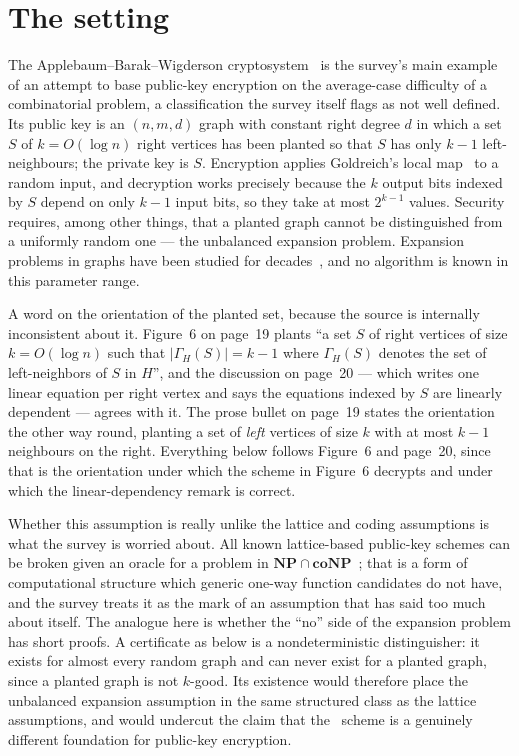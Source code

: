 \documentclass{aicr-conjecture}
\newcommand{\NP}{\mathbf{NP}}
\newcommand{\coNP}{\mathbf{coNP}}
\begin{document}
\section{The setting}\label{sec:setting}

The Applebaum--Barak--Wigderson cryptosystem~\cite{ABW10} is the
survey's main example of an attempt to base public-key encryption on
the average-case difficulty of a combinatorial problem, a
classification the survey itself flags as not well defined. Its public
key is an $(n,m,d)$ graph with constant right degree $d$ in which a set
$S$ of $k = O(\log n)$ right vertices has been planted so that $S$ has
only $k-1$ left-neighbours; the private key is $S$. Encryption applies
Goldreich's local map~\cite{Gol11,App15} to a random input, and
decryption works precisely because the $k$ output bits indexed by $S$
depend on only $k-1$ input bits, so they take at most $2^{k-1}$ values.
Security requires, among other things, that a planted graph cannot be
distinguished from a uniformly random one --- the unbalanced expansion
problem. Expansion problems in graphs have been studied for
decades~\cite{HLW06}, and no algorithm is known in this parameter
range.

A word on the orientation of the planted set, because the source is
internally inconsistent about it. Figure~6 on page~19 plants ``a set
$S$ of right vertices of size $k = O(\log n)$ such that
$|\Gamma_H(S)| = k-1$ where $\Gamma_H(S)$ denotes the set of
left-neighbors of $S$ in $H$'', and the discussion on page~20 --- which
writes one linear equation per right vertex and says the equations
indexed by $S$ are linearly dependent --- agrees with it. The prose
bullet on page~19 states the orientation the other way round, planting
a set of \emph{left} vertices of size $k$ with at most $k-1$ neighbours
on the right. Everything below follows Figure~6 and page~20, since that
is the orientation under which the scheme in Figure~6 decrypts and
under which the linear-dependency remark is correct.

Whether this assumption is really unlike the lattice and coding
assumptions is what the survey is worried about. All known
lattice-based public-key schemes can be broken given an oracle for a
problem in $\NP \cap \coNP$~\cite{AR05}; that is a form of
computational structure which generic one-way function candidates do
not have, and the survey treats it as the mark of an assumption that
has said too much about itself. The analogue here is whether the
``no'' side of the expansion problem has short proofs. A certificate as
below is a nondeterministic distinguisher: it exists for almost every
random graph and can never exist for a planted graph, since a planted
graph is not $k$-good. Its existence would therefore place the
unbalanced expansion assumption in the same structured class as the
lattice assumptions, and would undercut the claim that
the~\cite{ABW10} scheme is a genuinely different foundation for
public-key encryption.
\end{document}
